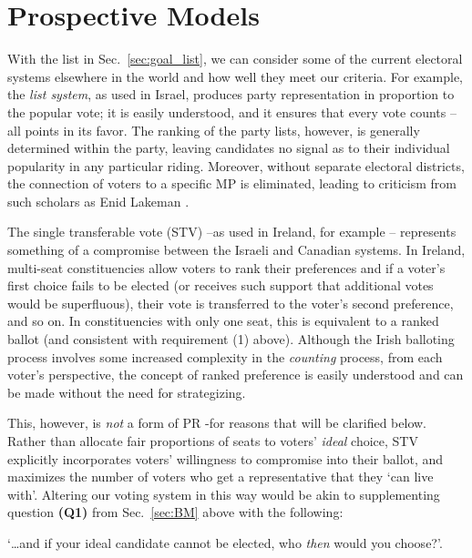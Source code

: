 \documentclass[DIV=calc, paper=a4, fontsize=11pt, twocolumn]{scrartcl}	 %
\begin{document}
\section{Prospective Models}
\label{sec:alt_models}

With the list in Sec.~\ref{sec:goal_list}, we can consider some of the current electoral systems elsewhere in the world and how well they meet our criteria. For example, the \emph{list system}, as used in Israel, produces party representation in proportion to the popular vote; it is easily understood, and it ensures that every vote counts \---all points in its favor. 
The ranking of the party lists, however, is generally determined within the party, leaving candidates no signal as to their individual popularity in any particular riding. Moreover, without separate electoral districts, the connection of voters to a specific MP is eliminated, leading to criticism from such scholars as Enid Lakeman\cite{Lakeman}
.

The single transferable vote (STV) \---as used in Ireland, for example\cite{Irish_howto_vote_doc}
\--- represents something of a compromise between the Israeli and Canadian systems. In Ireland, multi-seat constituencies allow voters to  rank their preferences and if a voter's first choice fails to be elected (or receives such support that additional votes would be superfluous), their vote is transferred to the voter's second preference, and so on. In constituencies with only one seat, this is equivalent to a ranked ballot (and consistent with requirement (1) above). 
Although the Irish balloting process involves some increased complexity in the \emph{counting} process, from each voter's perspective, the concept of ranked preference is easily understood and can be made without the need for strategizing.

This, however, is \emph{not} a form of PR \--for reasons that will be clarified below. 
Rather than allocate fair proportions of seats to voters' \emph{ideal} choice, STV explicitly incorporates voters' willingness to compromise into their ballot, and maximizes the number of voters who get a representative that they `can live with'.
Altering our voting system in this way would be akin to supplementing question \textbf{(Q1)} from Sec.~\ref{sec:BM} above with the following: 

\begin{tcolorbox}[colback=white!5!white,colframe=blue!55!black]
`\ldots and if your ideal candidate cannot be elected, who \emph{then} would you choose?'. 
\end{tcolorbox}
\end{document}
